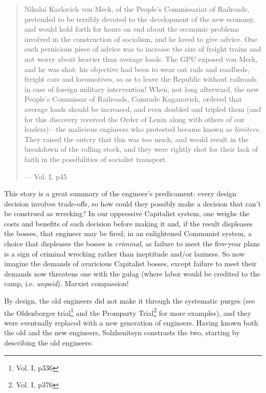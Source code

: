 \documentclass{article}
\begin{document}
\begin{quote}
Nikolai Karlovich von Meck, of the People's Commissariat of Railroads, pretended to be terribly devoted to the development of the new economy, and would hold forth for hours on end about the economic problems involved in the construction of socialism, and he loved to give advice.  One such pernicious piece of advice was to increase the size of freight trains and not worry about heavier than average loads.  The GPU exposed von Meck, and he was shot: his objective had been to wear out rails and roadbeds, freight cars and locomotives, so as to leave the Republic without railroads in case of foreign military intervention!  When, not long afterward, the new People's Commissar of Railroads, Comrade Kaganovich, ordered that average loads should be increased, and even doubled and tripled them (and for this discovery received the Order of Lenin along with others of our leaders)---the malicious engineers who protested became known as \emph{limiters}.  They raised the outcry that this was too much, and would result in the breakdown of the rolling stock, and they were rightly shot for their lack of faith in the possibilities of socialist transport.

--- Vol. I, p45
\end{quote}

This story is a great summary of the engineer's predicament: every design decision involves trade-offs, so how could they possibly make a decision that can't be construed as wrecking?  In our oppressive Capitalist system, one weighs the costs and benefits of each decision before making it and, if the result displeases the bosses, that engineer may be fired; in an enlightened Communist system, a choice that displeases the bosses is \emph{criminal}, as failure to meet the five-year plans is a sign of criminal wrecking rather than ineptitude and/or laziness.  So now imagine the demands of avaricious Capitalist bosses, except failure to meet their demands now threatens one with the gulag (where labor would be credited to the camp, i.e. \emph{unpaid}).  Marxist compassion!

By design, the old engineers did not make it through the systematic purges (see the Oldenborger trial\footnote{Vol. I, p336} and the Promparty Trial\footnote{Vol. I, p376} for more examples), and they were eventually replaced with a new generation of engineers.  Having known both the old and the new engineers, Solzhenitsyn constrasts the two, starting by describing the old engineers:
\end{document}
